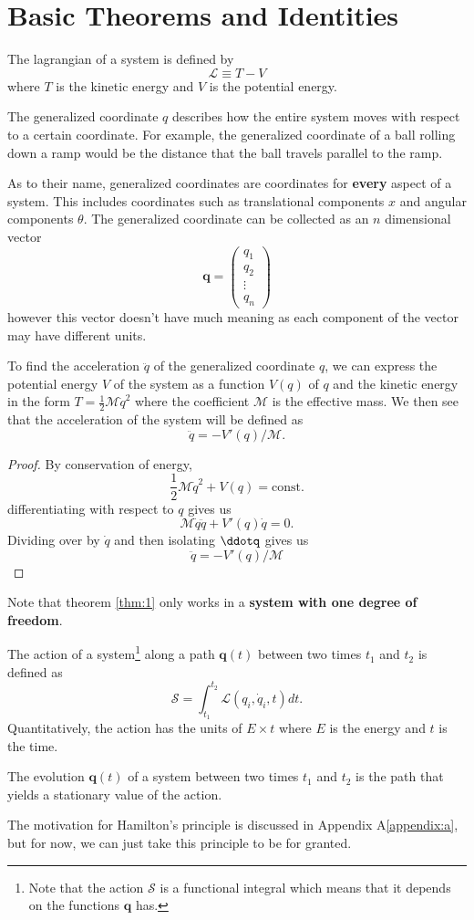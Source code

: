 \documentclass[11pt]{scrartcl}
\renewcommand\vec{\mathbf}
\begin{document}
\section{Basic Theorems and Identities}
\begin{definition}
The lagrangian of a system is defined by 
\[\mathcal{L} \equiv T - V\]
where $T$ is the kinetic energy and $V$ is the potential energy.
\end{definition}
\begin{definition}
The generalized coordinate $q$ describes how the entire system moves with respect to a certain
coordinate. For example, the generalized coordinate of a ball rolling down a ramp would be the distance that the ball travels parallel to the ramp.
\end{definition}
As to their name, generalized coordinates are coordinates for \textbf{every} aspect of a system. This includes coordinates such as translational components $x$ and angular components $\theta$. The generalized coordinate can be collected as an $n$ dimensional vector 
\[\vec{q} = \begin{pmatrix}
q_1 \\
q_2 \\
\vdots \\
q_n
\end{pmatrix}
\]
however this vector doesn't have much meaning as each component of the vector may have different units. 
\begin{theorem}
\label{thm:1}
To find the acceleration $\ddot{q}$ of the generalized coordinate $q$, we can express the potential energy $V$ of the system as a function $V\left(q\right)$ of $q$ and the kinetic energy in the form $T=\frac{1}{2}\mathcal{M}\dot{q}^2$ where the coefficient $\mathcal{M}$ is the effective mass. We then see that the acceleration of the system will be defined as
\[\ddot{q}=-V'\left(q\right)/\mathcal{M}.\]
\end{theorem}
\begin{proof}
By conservation of energy, 
\[\frac{1}{2} \mathcal{M}\dot{q}^2 + V (q) = \text{const.}\]
differentiating with respect to $q$ gives us 
\[\mathcal{M}\dot{q}\ddot{q} + V' (q)\dot{q} = 0.\]
Dividing over by $\dot{q}$ and then isolating $\ddotq$ gives us 
\[\ddot{q} = -V' (q)/\mathcal{M}\]
\end{proof}
Note that theorem \ref{thm:1} only works in a \textbf{system with one degree of freedom}.
\begin{definition}
The action of a system\footnote{Note that the action $\mathcal{S}$ is a functional integral which means that it depends on the functions $\vec{q}$ has.} along a path $\vec{q}(t)$ between two times $t_1$ and $t_2$ is defined as 
\[\mathcal{S} = \int_{t_1}^{t_2}\mathcal{L}(q_i, \dot{q}_i, t)dt.\]
Quantitatively, the action has the units of $E\times t$ where $E$ is the energy and $t$ is the time. 
\begin{theorem}
The evolution $\vec{q}(t)$ of a system between two times $t_1$ and $t_2$ is the path that yields a stationary value of the action. 
\end{theorem}
The motivation for Hamilton's principle is discussed in Appendix A\ref{appendix:a}, but for now, we can just take this principle to be for granted. 
\end{definition}
\end{document}
